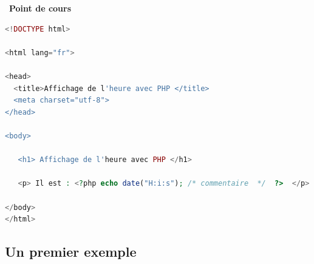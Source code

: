 \documentclass[
  11pt,
]{article}
\newcounter{cours}
\newenvironment{cours}[1]
{\par \medskip   \addtocounter{cours}{1} \noindent  
\begin{bclogo}[arrondi =0.1,  ombre = true, barre=none, logo=\bcbook, marge=4]{~\textbf{Point de cours} \textbf{\thecours} {\itshape #1} }  \par}
{
\end{bclogo}
 \par \bigskip }
\begin{document}
\begin{cours}{}
\begin{lstlisting}[language=PHP]
<!DOCTYPE html>

<html lang="fr">

<head>
  <title>Affichage de l'heure avec PHP </title>
  <meta charset="utf-8">    
</head>

<body>

   <h1> Affichage de l'heure avec PHP </h1>
   
   <p> Il est : <?php echo date("H:i:s"); /* commentaire  */  ?>  </p>

</body>
</html> 
\end{lstlisting}

\end{cours}

\hypertarget{un-premier-exemple}{%
\subsection{Un premier exemple}\label{un-premier-exemple}}
\end{document}
